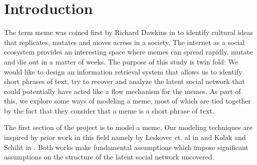 \documentclass{acm_proc_article-sp}
\begin{document}
\date{02 November 2011}

\maketitle


\section{Introduction}
The term meme was coined first by Richard Dawkins in \cite{dawkins2006selfish} to identify cultural ideas that replicates, mutates and moves across in a society. The internet as a social ecosystem provides an interesting space where memes can spread rapidly, mutate and die out in a matter of weeks. The purpose of this study is twin fold: We would like to design an information retrieval system that allows us to identify short phrases of text, try to recover and analyze the latent social network that could potentially have acted like a flow mechanism for the memes. As part of this, we explore some ways of modeling a meme, most of which are tied together by the fact that they consider that a meme is a short phrase of text. 

The first section of the project is to model a meme. Our modeling techniques are inspired by prior work in this field namely by Leskovec et. al in \cite{leskovec2009meme} and  Kolak and Schilit in \cite{kolak2008generating}. Both works make fundamental assumptions which impose significant assumptions on the structure of the latent social network uncovered. 
\end{document}
